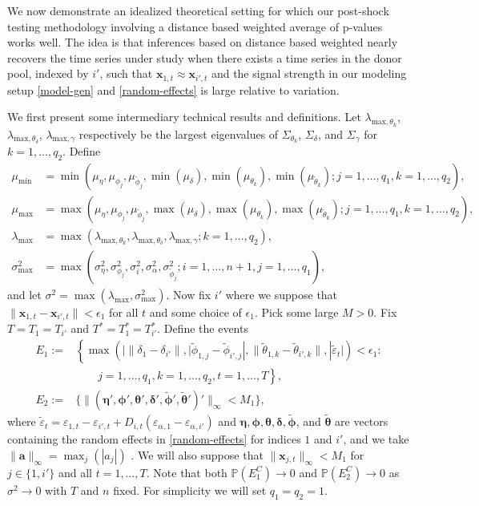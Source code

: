 \documentclass[11pt]{article}
\newcommand{\x}{\textbf{x}}
\newcommand{\Prob}{\mathbb{P}}
\theoremstyle{definition}
\begin{document}
We now demonstrate an idealized theoretical setting for which our post-shock testing methodology involving a distance based weighted average of p-values works well. The idea is that inferences based on distance based weighted nearly recovers the time series under study when there exists a time series in the donor pool, indexed by $i'$, such that $\x_{1,t} \approx \x_{i',t}$ and the signal strength in our modeling setup \eqref{model-gen} and \eqref{random-effects} is large relative to variation. 

We first present some intermediary technical results and definitions. Let $\lambda_{\text{max},\theta_k}$, $\lambda_{\text{max},\theta_\delta}$, $\lambda_{\text{max},\gamma}$ respectively be the largest eigenvalues of $\Sigma_{\theta_k}$, $\Sigma_{\delta}$, and $\Sigma_{\gamma}$ for $k = 1,\ldots,q_2$. Define  
\begin{align*}
  \mu_{\min} &= \min\left(\mu_\eta,\mu_{\phi_j},\mu_{\tilde\phi_j},\min(\mu_\delta),\min(\mu_{\theta_k}),\min(\mu_{\tilde\theta_k}); j = 1,\ldots,q_1, k = 1,\ldots,q_2\right), \\
  \mu_{\max} &= \max\left(\mu_\eta,\mu_{\phi_j},\mu_{\tilde\phi_j},\max(\mu_\delta),\max(\mu_{\theta_k}),\max(\mu_{\tilde\theta_k}); j = 1,\ldots,q_1, k = 1,\ldots,q_2\right), \\
  \lambda_{\max} &= \max\left(\lambda_{\text{max},\theta_k}, \lambda_{\text{max},\theta_\delta}, \lambda_{\text{max},\gamma}; k = 1,\ldots,q_2\right), \\
  \sigma^2_{\max} &= \max\left(\sigma^2_{\eta},\sigma^2_{\phi_j},\sigma^2_i,\sigma^2_{\alpha},\sigma^2_{\tilde{\phi}_j}; i = 1,\ldots,n+1, j = 1,\ldots,q_1\right),
\end{align*}
and let $\sigma^2 = \max(\lambda_{\max}, \sigma^2_{\max})$. Now fix $i'$ where we suppose that $\|\x_{1,t} - \x_{i',t}\| < \epsilon_1$ for all $t$ and some choice of $\epsilon_1$. Pick some large $M > 0$. Fix $T = T_1 = T_{i'}$ and $T^* = T^*_1 = T^*_{i'}$. Define the events 
\begin{align*}
  E_1 := &\left\{\max\left(|\|\delta_1 - \delta_{i'}\|,|\tilde\phi_{1,j}-\tilde\phi_{i',j}|,\|\tilde\theta_{1,k}-\tilde\theta_{i',k}\|,|\tilde\varepsilon_t|\right) < \epsilon_1:\right. \\
  &\qquad j = 1,\ldots,q_1, k = 1,\ldots,q_2, t = 1,\ldots,T \left.\right\}, \\
  E_2 := &\{\|(\bm{\eta}',\bm{\phi}',\bm{\theta}',\bm{\delta}',\tilde{\bm{\phi}}',\tilde{\bm{\theta}}')'\|_\infty < M_1\},  
\end{align*}
where $\tilde\varepsilon_t = \varepsilon_{1,t} - \varepsilon_{i',t} + D_{i,t}(\varepsilon_{\alpha,1} - \varepsilon_{\alpha,i'})$ and $\bm{\eta},\bm{\phi},\bm{\theta},\bm{\delta},\tilde{\bm{\phi}}$, and $\tilde{\bm{\theta}}$ are vectors containing the random effects in \eqref{random-effects} for indices $1$ and $i'$, and we take $\|\bm{a}\|_\infty = \max_j(|a_j|)$ . We will also suppose that $\|\x_{j,t}\|_\infty < M_1$ for $j \in \{1,i'\}$ and all $t = 1,\ldots,T$. Note that both $\Prob(E_1^C) \to 0$ and $\Prob(E_2^C) \to 0$  as $\sigma^2 \to 0$ with $T$ and $n$ fixed. For simplicity we will set $q_1 = q_2 = 1$. 
\end{document}
